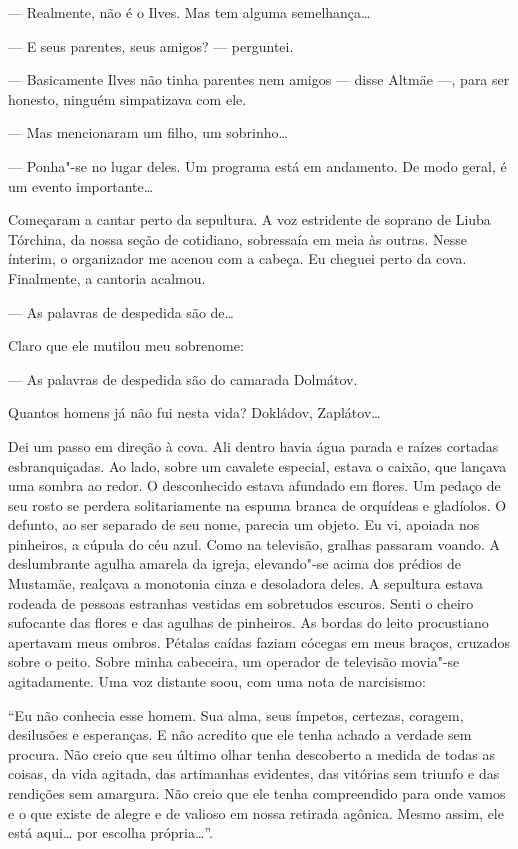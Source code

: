 --- Realmente, não é o Ilves. Mas tem alguma semelhança\ldots{}

--- E seus parentes, seus amigos? --- perguntei.

--- Basicamente Ilves não tinha parentes nem amigos --- disse Altmäe
---, para ser honesto, ninguém simpatizava com ele.

--- Mas mencionaram um filho, um sobrinho\ldots{}

--- Ponha"-se no lugar deles. Um programa está em andamento. De modo
geral, é um evento importante\ldots{}

Começaram a cantar perto da sepultura. A voz estridente de soprano de
Liuba Tórchina, da nossa seção de cotidiano, sobressaía em meia às
outras. Nesse ínterim, o organizador me acenou com a cabeça. Eu cheguei
perto da cova. Finalmente, a cantoria acalmou.

--- As palavras de despedida são de\ldots{} \label{ref9}

Claro que ele mutilou meu sobrenome:

--- As palavras de despedida são do camarada Dolmátov.

Quantos homens já não fui nesta vida? Dokládov, Zaplátov\ldots{}

Dei um passo em direção à cova. Ali dentro havia água parada e raízes
cortadas esbranquiçadas. Ao lado, sobre um cavalete especial, estava o
caixão, que lançava uma sombra ao redor. O desconhecido estava afundado
em flores. Um pedaço de seu rosto se perdera solitariamente na espuma
branca de orquídeas e gladíolos. O defunto, ao ser separado de seu nome,
parecia um objeto. Eu vi, apoiada nos pinheiros, a cúpula do céu azul.
Como na televisão, gralhas passaram voando. A deslumbrante agulha
amarela da igreja, elevando"-se acima dos prédios de Mustamäe, realçava a
monotonia cinza e desoladora deles. A sepultura estava rodeada de
pessoas estranhas vestidas em sobretudos escuros. Senti o cheiro
sufocante das flores e das agulhas de pinheiros. As bordas do leito
procustiano apertavam meus ombros. Pétalas caídas faziam cócegas em meus
braços, cruzados sobre o peito. Sobre minha cabeceira, um operador de
televisão movia"-se agitadamente. Uma voz distante soou, com uma nota de
narcisismo:

``Eu não conhecia esse homem. Sua alma, seus ímpetos, certezas, coragem,
desilusões e esperanças. E não acredito que ele tenha achado a verdade
sem procura. Não creio que seu último olhar tenha descoberto a medida de
todas as coisas, da vida agitada, das artimanhas evidentes, das vitórias
sem triunfo e das rendições sem amargura. Não creio que ele tenha
compreendido para onde vamos e o que existe de alegre e de valioso em
nossa retirada agônica. Mesmo assim, ele está aqui\ldots{} por escolha
própria\ldots{}''.

